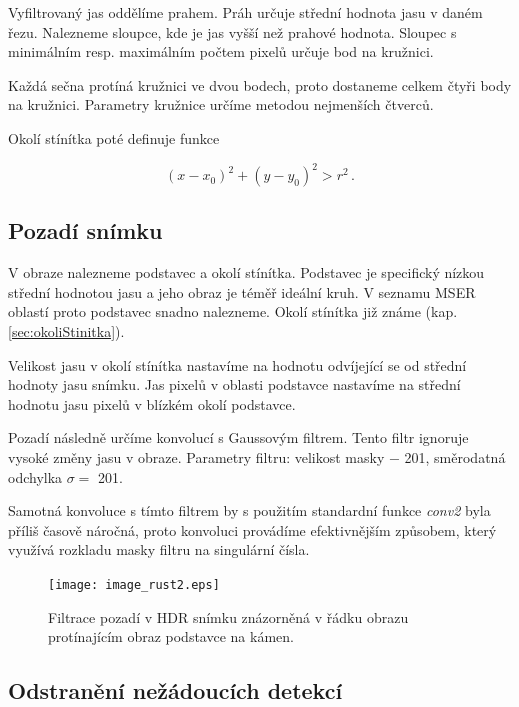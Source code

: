 Vyfiltrovaný jas oddělíme prahem. Práh určuje střední hodnota jasu v daném řezu. Nalezneme sloupce, kde je jas vyšší než prahové hodnota. Sloupec s minimálním resp. maximálním počtem pixelů určuje bod na kružnici.  

Každá sečna protíná kružnici ve dvou bodech, proto dostaneme celkem čtyři body na kružnici. Parametry kružnice určíme metodou nejmenších čtverců. 

Okolí stínítka poté definuje funkce 

\begin{equation}
	\left(x-x_0\right)^2 + \left(y-y_0\right)^2 > r^2\,.
	\label{eq:kruzniceOkoli}
	\end{equation}




\subsection{Pozadí snímku}
	V obraze nalezneme podstavec a okolí stínítka. Podstavec je specifický nízkou střední hodnotou jasu a jeho obraz je téměř ideální kruh. V seznamu MSER oblastí proto podstavec snadno nalezneme. Okolí stínítka již známe (kap. \ref{sec:okoliStinitka}).
	
	Velikost jasu v okolí stínítka nastavíme na hodnotu odvíjející se od střední hodnoty jasu snímku. Jas pixelů v oblasti podstavce nastavíme na střední hodnotu jasu pixelů v blízkém okolí podstavce.  
	
	Pozadí následně určíme konvolucí s Gaussovým filtrem. Tento filtr ignoruje vysoké změny jasu v obraze. Parametry filtru: velikost masky $-$ \SI{201}{\px}, směrodatná odchylka $\sigma = $ \SI{201}{\px}.
	
	Samotná konvoluce s tímto filtrem by s použitím standardní funkce \textit{conv2} byla příliš časově náročná, proto konvoluci provádíme efektivnějším způsobem, který využívá rozkladu masky filtru na singulární čísla.
	
\begin{figure}[htbp]
    \centering\texttt{[image: image\_rust2.eps]}
     \caption[Filtrace pozadí.]{Filtrace pozadí v HDR snímku znázorněná v řádku obrazu protínajícím obraz podstavce na kámen.}
        \label{fig:pozadi}
\end{figure}
	     
	     \newpage
\subsection{Odstranění nežádoucích detekcí}

